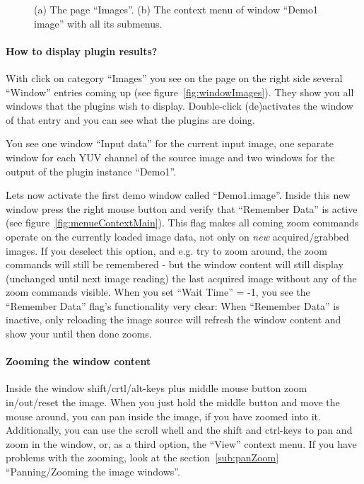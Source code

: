 \begin{figure}[ht]
  \begin{center}
  \end{center}
  \caption{(a) The page ``Images''.
    (b) The context menu of window ``Demo1 image'' with all its submenus.}
\end{figure}

\paragraph{How to display plugin results?}

With click on category ``Images'' you see on the page on the right
side several ``Window'' entries coming up (see
figure~\ref{fig:windowImages}). They show you all windows that the
plugins wish to display. Double-click (de)activates the window of
that entry and you can see what the plugins are doing.

You see one window ``Input data'' for the current input image, one
separate window for each YUV channel of the source image and two
windows for the output of the plugin instance ``Demo1''.

Lets now activate the first demo window called
``Demo1.image''. Inside this new window press the right mouse button
and verify that ``Remember Data'' is active (see
figure~\ref{fig:menueContextMain}). This flag makes all coming zoom
commands operate on the currently loaded image data, not only on
{\em new} acquired/grabbed images. If you deselect this option, and
e.g. try to zoom around, the zoom commands will still be remembered
- but the window content will still display (unchanged until next
image reading) the last acquired image without any of the zoom
commands visible. When you set ``Wait Time'' = -1, you see the
``Remember Data'' flag's functionality very clear: When ``Remember
Data'' is inactive, only reloading the image source will refresh the
window content and show your until then done zooms.

\paragraph{Zooming the window content}

Inside the window shift/crtl/alt-keys plus middle mouse button zoom
in/out/reset the image. When you just hold the middle button and
move the mouse around, you can pan inside the image, if you have
zoomed into it. Additionally, you can use the scroll whell and the
shift and ctrl-keys to pan and zoom in the window, or, as a third
option, the ``View'' context menu. If you have problems with the
zooming, look at the section~\ref{sub:panZoom}
``Panning/Zooming the image windows''.

